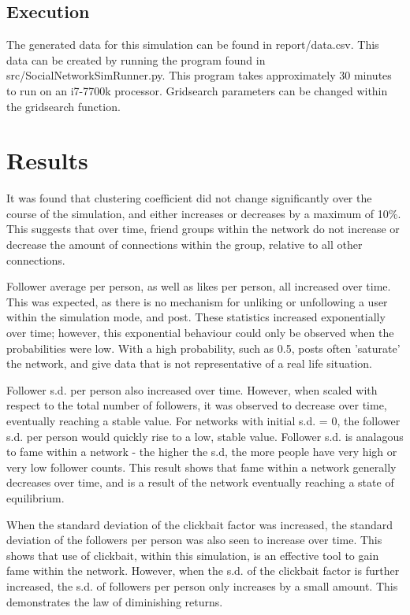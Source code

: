 \documentclass{article}
\begin{document}
\subsection{Execution}
The generated data for this simulation can be found in report/data.csv.
This data can be created by running the program found in src/SocialNetworkSimRunner.py.
This program takes approximately 30 minutes to run on an i7-7700k processor.
Gridsearch parameters can be changed within the gridsearch function.

\section{Results}

It was found that clustering coefficient did not change significantly over the
course of the simulation, and either increases or decreases by a maximum of 10\%.
This suggests that over time, friend groups within the network do not increase
or decrease the amount of connections within the group, relative to all other connections.

Follower average per person, as well as likes per person, all increased over time.
This was expected, as there is no mechanism for unliking or unfollowing a user
within the simulation mode, and post. These statistics increased exponentially over time;
however, this exponential behaviour could only be observed when the probabilities
were low. With a high probability, such as 0.5, posts often 'saturate' the network,
and give data that is not representative of a real life situation.

Follower s.d. per person also increased over time. However, when scaled with respect
to the total number of followers, it was observed to decrease over time,
eventually reaching a stable value. For networks with initial s.d. = 0,
the follower s.d. per person would quickly rise to a low, stable value.
Follower s.d. is analagous to fame within a network - the higher the s.d,
the more people have very high or very low follower counts.
This result shows that fame within a network generally decreases over time,
and is a result of the network eventually reaching a state of equilibrium.

When the standard deviation of the clickbait factor was increased, the standard
deviation of the followers per person was also seen to increase over time.
This shows that use of clickbait, within this simulation, is an effective
tool to gain fame within the network.
However, when the s.d. of the clickbait factor is further increased,
the s.d. of followers per person only increases by a small amount.
This demonstrates the law of diminishing returns.
\end{document}
